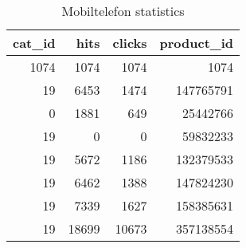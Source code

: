 \begin{table}[htbp]
\centering
\caption{Mobiltelefon statistics}
\label{table:Mobiltelefon_statistics}
\begin{tabular}{rrrr}
\toprule
 cat\_id &  hits &  clicks &  product\_id \\
\midrule
   1074 &  1074 &    1074 &        1074 \\
     19 &  6453 &    1474 &   147765791 \\
      0 &  1881 &     649 &    25442766 \\
     19 &     0 &       0 &    59832233 \\
     19 &  5672 &    1186 &   132379533 \\
     19 &  6462 &    1388 &   147824230 \\
     19 &  7339 &    1627 &   158385631 \\
     19 & 18699 &   10673 &   357138554 \\
\bottomrule
\end{tabular}
\end{table}
